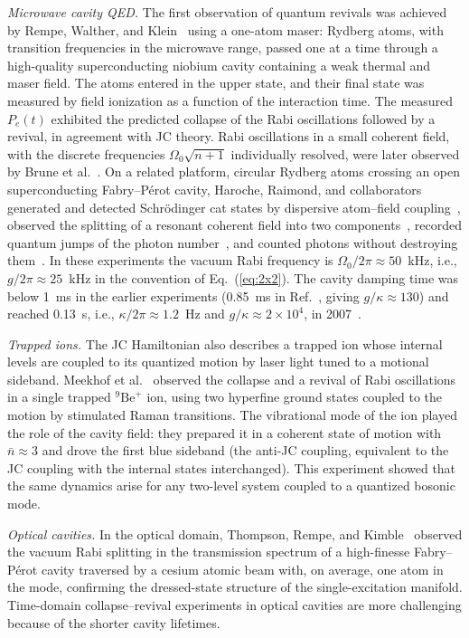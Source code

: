 \documentclass[%
 reprint,
 amsmath,amssymb,
 aps,
 floatfix,
]{revtex4-2}
\begin{document}
\textit{Microwave cavity QED.} The first observation of quantum revivals was achieved by Rempe, Walther, and Klein~\cite{rempe1987} using a one-atom maser: Rydberg atoms, with transition frequencies in the microwave range, passed one at a time through a high-quality superconducting niobium cavity containing a weak thermal and maser field. The atoms entered in the upper state, and their final state was measured by field ionization as a function of the interaction time. The measured $P_e(t)$ exhibited the predicted collapse of the Rabi oscillations followed by a revival, in agreement with JC theory. Rabi oscillations in a small coherent field, with the discrete frequencies $\Omega_0\sqrt{n+1}$ individually resolved, were later observed by Brune et al.~\cite{brune1996rabi}. On a related platform, circular Rydberg atoms crossing an open superconducting Fabry--P\'{e}rot cavity, Haroche, Raimond, and collaborators~\cite{haroche2006} generated and detected Schr\"{o}dinger cat states by dispersive atom--field coupling~\cite{brune1996}, observed the splitting of a resonant coherent field into two components~\cite{auffeves2003}, recorded quantum jumps of the photon number~\cite{gleyzes2007}, and counted photons without destroying them~\cite{guerlin2007}. In these experiments the vacuum Rabi frequency is $\Omega_0/2\pi \approx 50$~kHz, i.e., $g/2\pi \approx 25$~kHz in the convention of Eq.~(\ref{eq:2x2}). The cavity damping time was below 1~ms in the earlier experiments (0.85~ms in Ref.~\cite{auffeves2003}, giving $g/\kappa \approx 130$) and reached 0.13~s, i.e., $\kappa/2\pi \approx 1.2$~Hz and $g/\kappa \approx 2\times10^4$, in 2007~\cite{gleyzes2007}.

\textit{Trapped ions.} The JC Hamiltonian also describes a trapped ion whose internal levels are coupled to its quantized motion by laser light tuned to a motional sideband. Meekhof et al.~\cite{meekhof1996} observed the collapse and a revival of Rabi oscillations in a single trapped $^9\text{Be}^+$ ion, using two hyperfine ground states coupled to the motion by stimulated Raman transitions. The vibrational mode of the ion played the role of the cavity field: they prepared it in a coherent state of motion with $\bar{n} \approx 3$ and drove the first blue sideband (the anti-JC coupling, equivalent to the JC coupling with the internal states interchanged). This experiment showed that the same dynamics arise for any two-level system coupled to a quantized bosonic mode.

\textit{Optical cavities.} In the optical domain, Thompson, Rempe, and Kimble~\cite{thompson1992} observed the vacuum Rabi splitting in the transmission spectrum of a high-finesse Fabry--P\'{e}rot cavity traversed by a cesium atomic beam with, on average, one atom in the mode, confirming the dressed-state structure of the single-excitation manifold. Time-domain collapse--revival experiments in optical cavities are more challenging because of the shorter cavity lifetimes.
\end{document}

